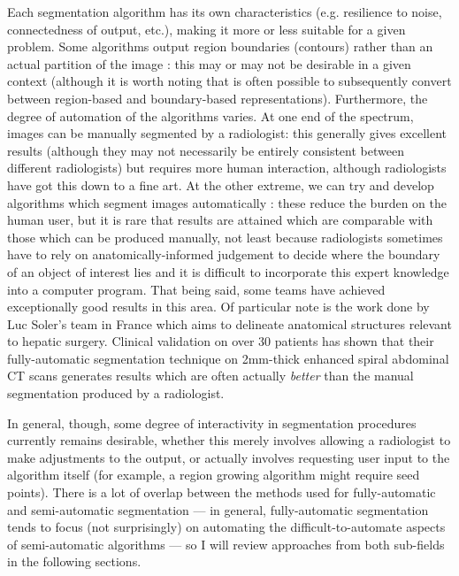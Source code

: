 Each segmentation algorithm has its own characteristics (e.g. resilience to noise, connectedness of output, etc.), making it more or less suitable for a given problem. Some algorithms output region boundaries (contours) rather than an actual partition of the image \cite{kass88,lobregt95,xu98}: this may or may not be desirable in a given context (although it is worth noting that is often possible to subsequently convert between region-based and boundary-based representations). Furthermore, the degree of automation of the algorithms varies. At one end of the spectrum, images can be manually segmented by a radiologist: this generally gives excellent results (although they may not necessarily be entirely consistent between different radiologists) but requires more human interaction, although radiologists have got this down to a fine art. At the other extreme, we can try and develop algorithms which segment images automatically \cite{lee03, lin06, marcotegui05, meijster98, park03, soler01, touhami05, tsagaan02}: these reduce the burden on the human user, but it is rare that results are attained which are comparable with those which can be produced manually, not least because radiologists sometimes have to rely on anatomically-informed judgement to decide where the boundary of an object of interest lies and it is difficult to incorporate this expert knowledge into a computer program. That being said, some teams have achieved exceptionally good results in this area. Of particular note is the work done by Luc Soler's team in France \cite{soler01} which aims to delineate anatomical structures relevant to hepatic surgery. Clinical validation on over 30 patients has shown that their fully-automatic segmentation technique on 2mm-thick enhanced spiral abdominal CT scans generates results which are often actually \emph{better} than the manual segmentation produced by a radiologist.

In general, though, some degree of interactivity in segmentation procedures currently remains desirable, whether this merely involves allowing a radiologist to make adjustments to the output, or actually involves requesting user input to the algorithm itself (for example, a region growing algorithm might require seed points). There is a lot of overlap between the methods used for fully-automatic and semi-automatic segmentation --- in general, fully-automatic segmentation tends to focus (not surprisingly) on automating the difficult-to-automate aspects of semi-automatic algorithms --- so I will review approaches from both sub-fields in the following sections.

